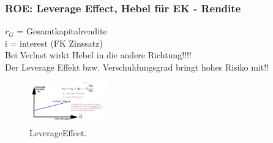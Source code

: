\documentclass[../ZF_Wing.tex]{subfiles}
\begin{document}
\subsubsection{ROE: Leverage Effect, Hebel für EK - Rendite}
$r_{G}$ = Gesamtkapitalrendite\\
i = interest (FK Zinssatz)\\
Bei Verlust wirkt Hebel in die andere Richtung!!!!\\
Der Leverage Effekt bzw. Verschuldungsgrad bringt hohes Risiko mit!!\\
\begin{figure}[H]
\centering
\includegraphics[width=0.3\textwidth]{Resources/Image/LeverageEffect.png}
\caption{\label{fig:LeverageEffect}LeverageEffect.}
\end{figure}
\end{document}
